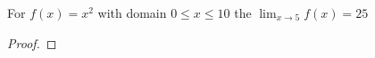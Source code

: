 
\begin{theorem}
  For $f(x)=x^2$ with domain $0 \le x \le 10$ the $\lim_{x \to 5}f(x)=25$
\end{theorem}

\begin{proof}
\end{proof}
